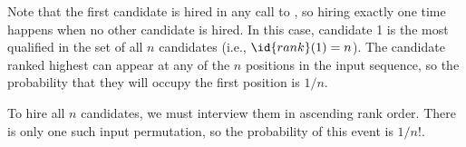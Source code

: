 Note that the first candidate is hired in any call to , so hiring exactly one time happens when no other candidate is hired.
In this case, candidate 1 is the most qualified in the set of all $n$ candidates (i.e., $\id{rank}(1)=n$).
The candidate ranked highest can appear at any of the $n$ positions in the input sequence, so the probability that they will occupy the first position is $1/n$.

To hire all $n$ candidates, we must interview them in ascending rank order.
There is only one such input permutation, so the probability of this event is $1/n!$.
